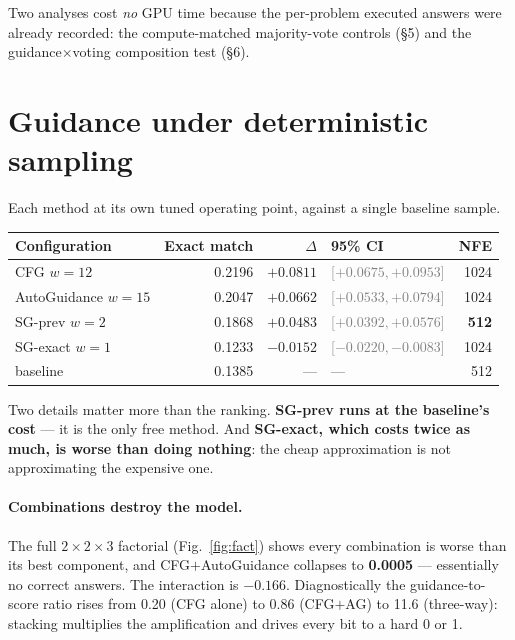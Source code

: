 \documentclass[11pt,a4paper]{article}
\newcommand{\gd}[1]{\textcolor{Good}{#1}}
\newcommand{\bd}[1]{\textcolor{Bad}{#1}}
\newcommand{\ci}[1]{{\footnotesize\textcolor{Grey}{#1}}}
\begin{document}
Two analyses cost \emph{no} GPU time because the per-problem executed answers were already recorded: the compute-matched majority-vote controls (\S5) and the guidance$\times$voting composition test (\S6).

\section{Guidance under deterministic sampling}
Each method at its own tuned operating point, against a single baseline sample.

\begin{center}\small
\begin{tabular}{lrrlr}
\toprule
\textbf{Configuration} & \textbf{Exact match} & \textbf{$\Delta$} & \textbf{95\% CI} & \textbf{NFE} \\
\midrule
CFG $w{=}12$              & 0.2196 & \gd{$+0.0811$} & \ci{[$+0.0675,+0.0953$]} & 1024 \\
AutoGuidance $w{=}15$     & 0.2047 & \gd{$+0.0662$} & \ci{[$+0.0533,+0.0794$]} & 1024 \\
SG-prev $w{=}2$           & 0.1868 & \gd{$+0.0483$} & \ci{[$+0.0392,+0.0576$]} & \textbf{512} \\
SG-exact $w{=}1$          & 0.1233 & \bd{$-0.0152$} & \ci{[$-0.0220,-0.0083$]} & 1024 \\
\midrule
baseline                  & 0.1385 & --- & --- & 512 \\
\bottomrule
\end{tabular}
\end{center}

Two details matter more than the ranking. \textbf{SG-prev runs at the baseline's cost} --- it is the only free method. And \textbf{SG-exact, which costs twice as much, is worse than doing nothing}: the cheap approximation is not approximating the expensive one.

\paragraph{Combinations destroy the model.} The full $2\times2\times3$ factorial (Fig.~\ref{fig:fact}) shows every combination is worse than its best component, and CFG${+}$AutoGuidance collapses to \textbf{0.0005} --- essentially no correct answers. The interaction is $-0.166$. Diagnostically the guidance-to-score ratio rises from 0.20 (CFG alone) to 0.86 (CFG${+}$AG) to 11.6 (three-way): stacking multiplies the amplification and drives every bit to a hard 0 or 1.
\end{document}
